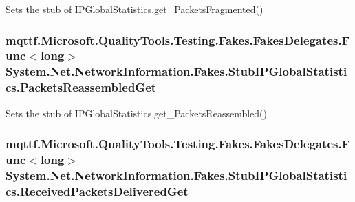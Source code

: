Sets the stub of I\-P\-Global\-Statistics.\-get\-\_\-\-Packets\-Fragmented()

\hypertarget{class_system_1_1_net_1_1_network_information_1_1_fakes_1_1_stub_i_p_global_statistics_a1c5e2f76c030c8b7782d0601ca9f7a23}{
\subsubsection[{Packets\-Reassembled\-Get}]{\setlength{\rightskip}{0pt plus 5cm}mqttf.\-Microsoft.\-Quality\-Tools.\-Testing.\-Fakes.\-Fakes\-Delegates.\-Func$<$long$>$ System.\-Net.\-Network\-Information.\-Fakes.\-Stub\-I\-P\-Global\-Statistics.\-Packets\-Reassembled\-Get}}\label{class_system_1_1_net_1_1_network_information_1_1_fakes_1_1_stub_i_p_global_statistics_a1c5e2f76c030c8b7782d0601ca9f7a23}


Sets the stub of I\-P\-Global\-Statistics.\-get\-\_\-\-Packets\-Reassembled()

\hypertarget{class_system_1_1_net_1_1_network_information_1_1_fakes_1_1_stub_i_p_global_statistics_a26549b98111f117269ff9d82a39fc1c8}{
\subsubsection[{Received\-Packets\-Delivered\-Get}]{\setlength{\rightskip}{0pt plus 5cm}mqttf.\-Microsoft.\-Quality\-Tools.\-Testing.\-Fakes.\-Fakes\-Delegates.\-Func$<$long$>$ System.\-Net.\-Network\-Information.\-Fakes.\-Stub\-I\-P\-Global\-Statistics.\-Received\-Packets\-Delivered\-Get}}\label{class_system_1_1_net_1_1_network_information_1_1_fakes_1_1_stub_i_p_global_statistics_a26549b98111f117269ff9d82a39fc1c8}


